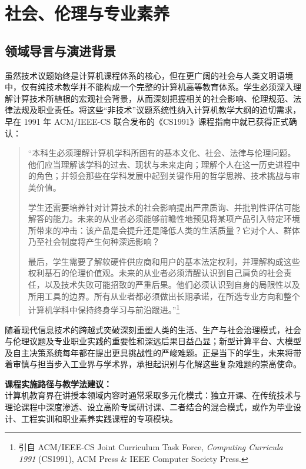 \chapter{社会、伦理与专业素养}

\section{领域导言与演进背景}

\begin{preamblebox}[知识领域概述与时代演进]
虽然技术议题始终是计算机课程体系的核心，但在更广阔的社会与人类文明语境中，仅有纯技术教学并不能构成一个完整的计算机高等教育体系。学生必须深入理解计算技术所植根的宏观社会背景，从而深刻把握相关的社会影响、伦理规范、法律法规及职业责任。将这些“非技术”议题系统性纳入计算机教学大纲的迫切需求，早在 1991 年 ACM/IEEE-CS 联合发布的《CS1991》课程指南中就已获得正式确认：
\begin{quote}
\small\songti
“本科生必须理解计算机学科所固有的基本文化、社会、法律与伦理问题。他们应当理解该学科的过去、现状与未来走向；理解个人在这一历史进程中的角色；并领会那些在学科发展中起到关键作用的哲学思辨、技术挑战与审美价值。

学生还需要培养针对计算技术的社会影响提出严肃质询、并批判性评估可能解答的能力。未来的从业者必须能够前瞻性地预见将某项产品引入特定环境所带来的冲击：该产品是会提升还是降低人类的生活质量？它对个人、群体乃至社会制度将产生何种深远影响？

最后，学生需要了解软硬件供应商和用户的基本法定权利，并理解构成这些权利基石的伦理价值观。未来的从业者必须清醒认识到自己肩负的社会责任，以及技术失败可能招致的严重后果。他们必须认识到自身的局限性以及所用工具的边界。所有从业者都必须做出长期承诺，在所选专业方向和整个计算机学科中保持终身学习与前沿跟进。”\footnote{引自 ACM/IEEE-CS Joint Curriculum Task Force, \textit{Computing Curricula 1991} (CS1991), ACM Press \& IEEE Computer Society Press.}
\end{quote}

随着现代信息技术的跨越式突破深刻重塑人类的生活、生产与社会治理模式，社会与伦理议题及专业职业实践的重要性和深远后果日益凸显；新型计算平台、大模型及自主决策系统每年都在提出更具挑战性的严峻难题。正是当下的学生，未来将带着审慎与担当步入工业界与学术界，承担起识别与化解这些复杂难题的崇高使命。

\textbf{课程实施路径与教学法建议：}\\
计算机教育界在讲授本领域内容时通常采取多元化模式：独立开课、在传统技术与理论课程中深度渗透、设立高阶专属研讨课、二者结合的混合模式，或作为毕业设计、工程实训和职业素养实践课程的专项模块。


\end{preamblebox}
